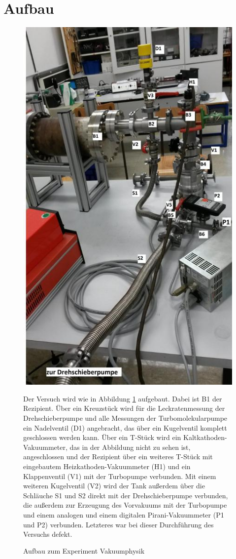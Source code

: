 \section{Aufbau}
\label{sec:Aufbau}

\begin{figure}
\begin{minipage}{0.48\textwidth}
\includegraphics[scale=0.45]{content/images/Aufbau.jpg}
\caption{Aufbau zum Experiment Vakuumphysik\cite{V70}}
\label{fig:Aufbau}
\end{minipage}
\hfil
\begin{minipage}{0.42\textwidth}
Der Versuch wird wie in Abbildung \ref{fig:Aufbau} aufgebaut. Dabei ist B1 der Rezipient. Über ein Kreuzstück wird für die Leckratenmessung der Drehschieberpumpe und alle Messungen der Turbomolekularpumpe ein Nadelventil (D1) angebracht, das über ein Kugelventil komplett geschlossen werden kann. Über ein T-Stück wird ein Kaltkathoden-Vakuummeter, das in der Abbildung nicht zu sehen ist, angeschlossen und der Rezipient über ein weiteres T-Stück mit eingebautem Heizkathoden-Vakuummeter (H1) und ein Klappenventil (V1) mit der Turbopumpe verbunden. Mit einem weiteren Kugelventil (V2) wird der Tank außerdem über die Schläuche S1 und S2 direkt mit der Drehschieberpumpe verbunden, die außerdem zur Erzeugung des Vorvakuums mit der Turbopumpe und einem analogen und einem digitalen Pirani-Vakuummeter (P1 und P2) verbunden. Letzteres war bei dieser Durchführung des Versuchs defekt.

\end{minipage}
\end{figure}

